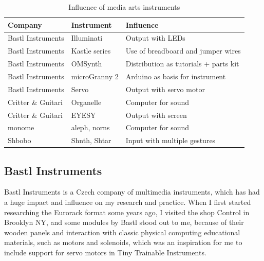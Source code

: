 \begin{table}[ht]
    \centering
    \begin{tabular}{ | l |  l | l |}
        \hline
        Company             & Instrument    & Influence                             \\
        \hline
        Bastl Instruments   & Illuminati    & Output with LEDs                      \\
        Bastl Instruments   & Kastle series & Use of breadboard and jumper wires    \\
        Bastl Instruments   & OMSynth       & Distribution as tutorials + parts kit \\
        Bastl Instruments   & microGranny 2 & Arduino as basis for instrument       \\
        Bastl Instruments   & Servo         & Output with servo motor               \\
        Critter \& Guitari  & Organelle     & Computer for sound                    \\
        Critter \& Guitari  & EYESY         & Output with screen                    \\
        monome              & aleph, norns  & Computer for sound                    \\
        Shbobo              & Shnth, Shtar  & Input with multiple gestures          \\
        \hline
    \end{tabular}
    \caption{Influence of media arts instruments}
    \label{table:media-arts-instruments-influence}
\end{table}{}

\subsection{Bastl Instruments}

Bastl Instruments is a Czech company of multimedia instruments, which has had a huge impact and influence on my research and practice. When I first started researching the Eurorack format some years ago, I visited the shop Control in Brooklyn NY, and some modules by Bastl stood out to me, because of their wooden panels and interaction with classic physical computing educational materials, such as motors and solenoids, which was an inspiration for me to include support for servo motors in Tiny Trainable Instruments.

